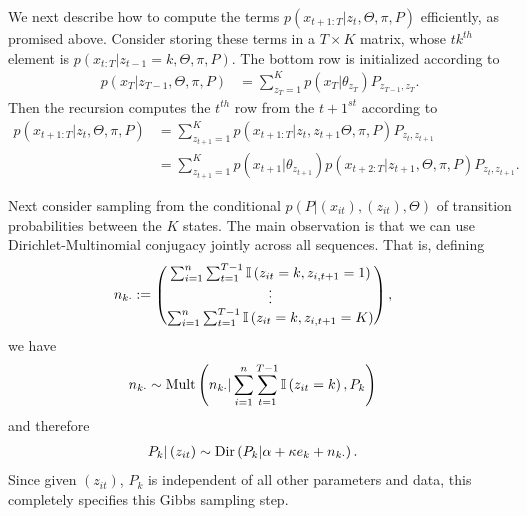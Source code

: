 \documentclass[14pt]{extarticle}
\begin{document}
We next describe how to compute the terms $p\left(x_{t + 1:T} \vert z_t, \Theta,
\pi, P\right)$ efficiently, as promised above. Consider storing these terms in a
$T \times K$ matrix, whose $tk^{th}$ element is $p\left(x_{t:T} \vert z_{t - 1} =
k, \Theta, \pi, P\right)$. The bottom row is initialized according to
\begin{align*}
 p\left(x_T \vert z_{T - 1}, \Theta, \pi, P\right)  &= \sum_{z_{T} = 1}^{K} p\left(x_{T} \vert \theta_{z_{T}}\right) P_{z_{T - 1}, z_{T}}.
\end{align*}
Then the recursion computes the $t^{th}$ row from the $t + 1^{st}$ according to
\begin{align*}
  p\left(x_{t + 1:T} \vert z_t, \Theta, \pi, P\right) &= \sum_{z_{t + 1} = 1}^{K} p\left(x_{t + 1 : T} \vert z_{t}, z_{t + 1} \Theta, \pi, P\right) P_{z_{t}, z_{t + 1}} \\
  &= \sum_{z_{t + 1} = 1}^{K} p\left(x_{t + 1} \vert \theta_{z_{t + 1}}\right) p\left(x_{t + 2 : T} \vert z_{t + 1}, \Theta, \pi, P\right) P_{z_{t}, z_{t + 1}}.
\end{align*}

Next consider sampling from the conditional $p\left(P \vert \left(x_{it}\right),
\left(z_{it}\right), \Theta\right)$ of transition probabilities between the $K$
states. The main observation is that we can use Dirichlet-Multinomial conjugacy
jointly across all sequences. That is, defining
\begin{align*}
 n_{k \cdot} &:= \begin{pmatrix} \sum_{i = 1}^{n} \sum_{t = 1}^{T - 1} \mathbb{I}\left({z_{it} = k, z_{i,t + 1} = 1}\right) \\ \vdots \\ \sum_{i = 1}^{n} \sum_{t = 1}^{T - 1} \mathbb{I}\left({z_{it} = k, z_{i,t + 1} = K}\right) \end{pmatrix},
\end{align*}
we have
\begin{align*}
n_{k\cdot} &\sim \textnormal{Mult}\left(n_{k\cdot} \vert \sum_{i = 1}^{n} \sum_{t = 1}^{T - 1} \mathbb{I}\left({z_{it} = k}\right), P_{k}\right)
\end{align*}
and therefore
\begin{align}
  \label{eq:sticky_hmm_p_update}
  P_{k} \vert \left(z_{it}\right) &\sim \textnormal{Dir}\left(P_{k} \vert \alpha + \kappa e_{k} + n_{k\cdot}\right).
\end{align}
Since given $\left(z_{it}\right)$, $P_{k}$ is independent of all other
parameters and data, this completely specifies this Gibbs sampling step.
\end{document}
